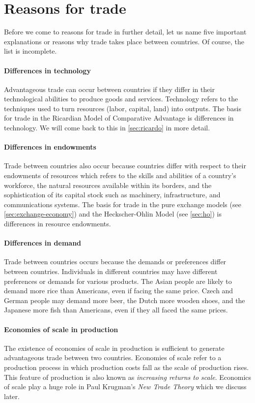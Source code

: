 \section{Reasons for trade}{\label{sec:reasons}\label{Reasons for trade}
	
	Before we come to reasons for trade in further detail, let us name five important explanations or reasons why trade takes place between countries. Of course, the list is incomplete.
	
	\paragraph{Differences in technology}
	Advantageous trade can occur between countries if they differ in their technological abilities to produce goods and services. Technology refers to the techniques used to turn resources (labor, capital, land) into outputs. The basis for trade in the Ricardian Model of Comparative Advantage is differences in technology. We will come back to this in \autoref{sec:ricardo} in more detail.
	
	\paragraph{Differences in endowments}	
	Trade between countries also occur because countries differ with respect to their endowments of resources which refers to the skills and abilities of a country's workforce, the natural resources available within its borders, and the sophistication of its capital stock such as machinery, infrastructure, and communications systems. The basis for trade in the pure exchange models (see \autoref{sec:exchange-economy}) and the Heckscher-Ohlin Model (see \autoref{sec:ho}) is differences in resource endowments.
	
	\paragraph{Differences in demand}
	Trade between countries occurs because the demands or preferences differ between countries. Individuals in different countries may have different preferences or demands for various products. The Asian people are likely to demand more rice than Americans, even if facing the same price. Czech and German people may demand more beer, the Dutch more wooden shoes, and the Japanese more fish than Americans, even if they all faced the same prices.
	
	\paragraph{Economies of scale in production}
	The existence of economies of scale in production is sufficient to generate advantageous trade between two countries. Economies of scale refer to a production process in which production costs fall as the scale of production rises. This feature of production is also known as \textit{increasing returns to scale}. Economics of scale play a huge role in Paul Krugman's \textit{New Trade Theory} which we discuss later.  
	
}
